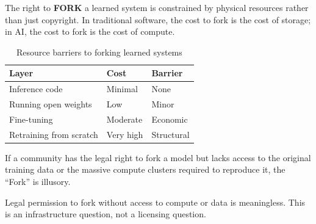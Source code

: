 The right to \textbf{FORK} a learned system is constrained by physical resources rather than just copyright. In traditional software, the cost to fork is the cost of storage; in AI, the cost to fork is the cost of compute.

\begin{table}[htbp]
\centering
\begin{tabular}{@{}lll@{}}
\toprule
\textbf{Layer} & \textbf{Cost} & \textbf{Barrier} \\
\midrule
Inference code & Minimal & None \\
Running open weights & Low & Minor \\
Fine-tuning & Moderate & Economic \\
Retraining from scratch & Very high & Structural \\
\bottomrule
\end{tabular}
\caption{Resource barriers to forking learned systems}
\end{table}

If a community has the legal right to fork a model but lacks access to the original training data or the massive compute clusters required to reproduce it, the ``Fork'' is illusory.

\begin{claim}
Legal permission to fork without access to compute or data is meaningless. This is an infrastructure question, not a licensing question.
\end{claim}